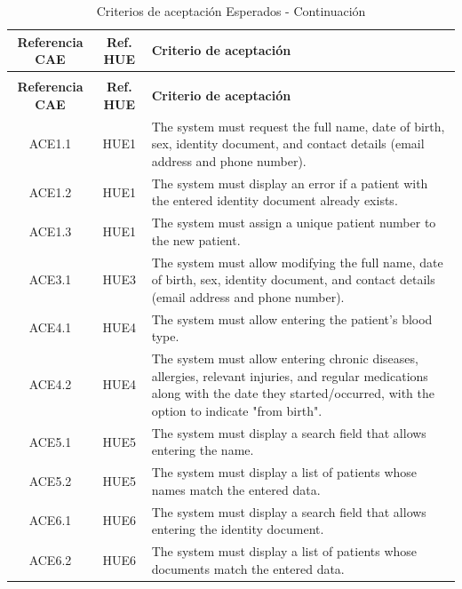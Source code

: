 \documentclass{prgrado}
\begin{document}
\begin{longtable}{|c|c|p{9cm}|}
\caption{Criterios de aceptación Esperados} 
\label{tab:criterios_esperados} \\
\hline
\textbf{Referencia CAE} & \textbf{Ref. HUE} & \textbf{Criterio de aceptación} \\
\hline
\endfirsthead

\caption{Criterios de aceptación Esperados - Continuación} \\
\hline
\textbf{Referencia CAE} & \textbf{Ref. HUE} & \textbf{Criterio de aceptación} \\
\hline
\endhead

\hline
\endfoot

\hline
\endlastfoot
ACE1.1 & HUE1 & The system must request the full name, date of birth, sex, identity document, and contact details (email address and phone number). \\ \hline
ACE1.2 & HUE1 & The system must display an error if a patient with the entered identity document already exists. \\ \hline
ACE1.3 & HUE1 & The system must assign a unique patient number to the new patient. \\ \hline

ACE3.1 & HUE3 & The system must allow modifying the full name, date of birth, sex, identity document, and contact details (email address and phone number). \\ \hline

ACE4.1 & HUE4 & The system must allow entering the patient's blood type. \\ \hline
ACE4.2 & HUE4 & The system must allow entering chronic diseases, allergies, relevant injuries, and regular medications along with the date they started/occurred, with the option to indicate "from birth". \\ \hline

ACE5.1 & HUE5 & The system must display a search field that allows entering the name. \\ \hline
ACE5.2 & HUE5 & The system must display a list of patients whose names match the entered data. \\ \hline

ACE6.1 & HUE6 & The system must display a search field that allows entering the identity document. \\ \hline
ACE6.2 & HUE6 & The system must display a list of patients whose documents match the entered data. \\ \hline


\end{longtable}
\end{document}
